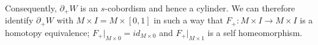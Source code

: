 Consequently, $\partial_+ W$ is an $s$-cobordism and hence a
cylinder. We can therefore identify $\partial _+ W$ with $M \times I= M
\times [0, 1]$ in such a way that $F_+ : M \times I \to M \times I$ is
a homotopy equivalence; $F_+|_{M \times 0} = id_{M \times 0}$ and
$F_+|_{M \times 1}$ is a self homeomorphism.
